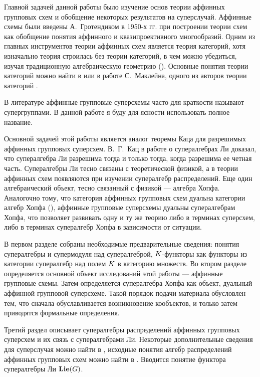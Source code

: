 Главной задачей данной работы было изучение основ теории аффинных групповых
схем и обобщение некоторых результатов на суперслучай.
Аффинные схемы были введены А.~Гротендиком в 1950-х гг. при построении теории схем
как обобщение понятия аффинного и квазипроективного многообразий.
Одним из главных инструментов теории аффинных схем является теория категорий,
хотя изначально теория строилась без теории категорий, в чем можно убедиться,
изучая традиционную алгебраическую геометрию (\cite{shafarevich}).
Основные понятия теории категорий можно найти в \cite{category_introduction}
или в работе С.~Маклейна, одного из авторов теории категорий \cite{mclane}.

В литературе аффинные групповые суперсхемы часто для краткости
называют супергруппами. В данной работе я буду для ясности использовать полное название.

Основной задачей этой работы является аналог теоремы Каца
для разрешимых аффинных групповых суперсхем. В.~Г.~Кац в работе \cite{kac}
о супералгебрах Ли доказал, что супералгебра Ли разрешима тогда и только тогда,
когда разрешима ее четная часть. Супералгебры Ли тесно связаны с теоретической
физикой, а в теории аффинных схем появляются при изучении супералгебр распределений.
Еще один алгебраический объект, тесно связанный с физикой --- алгебра Хопфа.
Аналогочно тому, что категория аффинных групповых схем дуальна категории алгебр Хопфа
(\cite{waterhouse}), аффинные групповые суперсхемы дуальны супералгебрам Хопфа,
что позволяет развивать одну и ту же теорию либо в терминах суперсхем,
либо в терминах супералгебр Хопфа в зависимости от ситуации.

%
В первом разделе собраны необходимые предварительные сведения: 
понятия супералгебры и супермодуля над супералгеброй, $K$-функторы как функторы
из категории супералгебр над полем $K$ в категорию множеств.
Во втором разделе определяется основной объект исследований этой работы ---
аффинные групповые схемы. Затем определяется супералгебра Хопфа
как объект, дуальный аффинной групповой суперсхеме. Такой порядок подачи материала
обусловлен тем, что сначала обуславливается возникновение кообъектов,
и только затем приводятся формальные определения.


Третий раздел описывает супералгебры распределений аффинных групповых суперсхем
и их связь с супералгебрами Ли. Некоторые дополнительные сведения для суперслучая
можно найти в \cite{affine_quotients}, исходные понятия алгебр распределений
аффинных групповых схем можно найти в \cite{waterhouse}.
Вводится понятие функтора супералгебры Ли $ \mathbf{Lie}(G) $.


